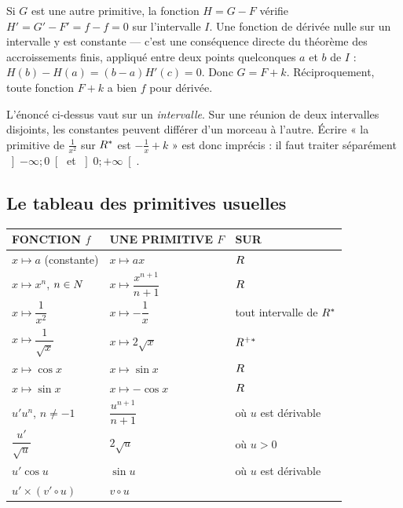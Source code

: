 \begin{demonstration}
Si $G$ est une autre primitive, la fonction $H = G-F$ vérifie
$H' = G'-F' = f-f = 0$ sur l'intervalle $I$. Une fonction de dérivée nulle sur
un intervalle y est constante — c'est une conséquence directe du théorème des
accroissements finis, appliqué entre deux points quelconques $a$ et $b$ de
$I$ : $H(b)-H(a) = (b-a)H'(c) = 0$. Donc $G = F+k$. Réciproquement, toute
fonction $F+k$ a bien $f$ pour dérivée.
\end{demonstration}

\begin{avertissement}
L'énoncé ci-dessus vaut sur un \emph{intervalle}. Sur une réunion de deux
intervalles disjoints, les constantes peuvent différer d'un morceau à l'autre.
Écrire « la primitive de $\frac{1}{x^{2}}$ sur $R^{*}$ est $-\frac{1}{x}+k$ »
est donc imprécis : il faut traiter séparément $\left]-\infty;0\right[$ et
$\left]0;+\infty\right[$.
\end{avertissement}

\subsection{Le tableau des primitives usuelles}

\begin{center}
\renewcommand{\arraystretch}{1.6}
\begin{tabular}{@{}p{4.3cm} p{4.3cm} p{3.6cm}@{}}
\toprule
\textsf{\footnotesize\bfseries FONCTION $f$} &
\textsf{\footnotesize\bfseries UNE PRIMITIVE $F$} &
\textsf{\footnotesize\bfseries SUR} \\
\midrule
$x \mapsto a$ (constante)        & $x \mapsto ax$                       & $R$ \\
$x \mapsto x^{n}$, $n \in N$    & $x \mapsto \dfrac{x^{n+1}}{n+1}$     & $R$ \\
$x \mapsto \dfrac{1}{x^{2}}$     & $x \mapsto -\dfrac{1}{x}$            & tout intervalle de $R^{*}$ \\
$x \mapsto \dfrac{1}{\sqrt{x}}$  & $x \mapsto 2\sqrt{x}$                & $R^{+*}$ \\
$x \mapsto \cos x$               & $x \mapsto \sin x$                   & $R$ \\
$x \mapsto \sin x$               & $x \mapsto -\cos x$                  & $R$ \\
\midrule
$u'u^{n}$, $n \neq -1$           & $\dfrac{u^{n+1}}{n+1}$               & où $u$ est dérivable \\
$\dfrac{u'}{\sqrt{u}}$           & $2\sqrt{u}$                          & où $u > 0$ \\
$u'\cos u$                       & $\sin u$                             & où $u$ est dérivable \\
$u' \times (v'\circ u)$          & $v \circ u$                          & \\
\bottomrule
\end{tabular}
\end{center}

